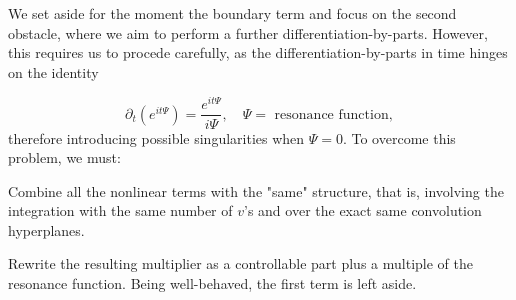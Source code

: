 \documentclass[%
11pt,  reqno]{amsart}
\newcommand{\5}{\textup{V}}
\newcommand{\noi}{\noindent}
\theoremstyle{remark}
\numberwithin{equation}{section}
\numberwithin{theorem}{section}
\begin{document}
\medskip
We set aside for the moment the boundary term and focus on the second obstacle, where we aim to perform a further differentiation-by-parts. However, this requires us to procede carefully, as the differentiation-by-parts in time hinges on the identity
	
	
	$$\partial_t\left(e^{it\Psi}\right) = \frac{e^{it\Psi}}{i\Psi}, \quad \Psi=\mbox{ resonance function},
	$$
	therefore introducing possible singularities when $\Psi=0$. To overcome this problem, we must:

    \smallskip
\noi{\bf Step 1.}
    Combine all the nonlinear terms with the "same" structure, that is, involving the integration with the same number of $v$'s and over the exact same convolution hyperplanes. 
  
    \smallskip
\noi{\bf Step 2.}
    Rewrite the resulting multiplier as a controllable part plus a multiple of the resonance function. Being well-behaved, the first term is left aside.
      
\end{document}
